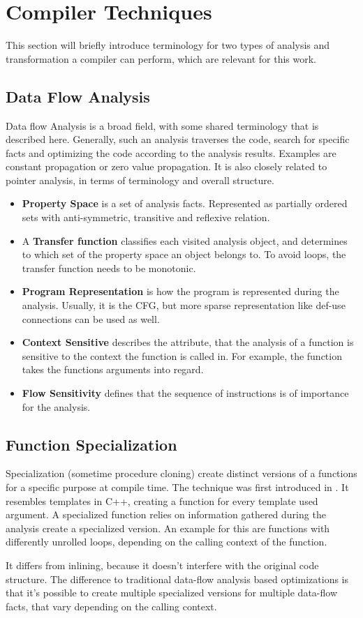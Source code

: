 \section{Compiler Techniques}
This section will briefly introduce terminology for two types of analysis and transformation a compiler can perform, which are relevant
for this work.
\subsection{Data Flow Analysis}
Data flow Analysis is a broad field, with some shared terminology that is described here. Generally, such an analysis traverses the code,
search for specific facts and optimizing the code according to the analysis results. Examples are constant propagation or zero value propagation. It is also closely related to pointer analysis, in terms of terminology and overall structure.
\begin{itemize}
	\item \textbf{Property Space} is a set of analysis facts. Represented as partially ordered sets with anti-symmetric, transitive and reflexive relation.\cite{Rastello:2016:SCD:3002539}
	\item A \textbf{Transfer function} classifies each visited analysis object, and determines to which set of the property space an object belongs to. To avoid loops, the transfer function needs to be monotonic. \cite{Rastello:2016:SCD:3002539}
	\item \textbf{Program Representation} is how the program is represented during the analysis. Usually, it is the CFG, but more sparse representation like def-use connections can be used as well. \cite{Rastello:2016:SCD:3002539}
	\item \textbf{Context Sensitive} describes the attribute, that the analysis of a function is sensitive to the context the function is called in. For example, the function
	takes the functions arguments into regard. \cite{Emami:1994:CIP:178243.178264}
	\item \textbf{Flow Sensitivity} defines that the sequence of instructions is of importance for the analysis. \cite{Hardekopf:2009:SFP:1480881.1480911}
\end{itemize}

\subsection{Function Specialization}
Specialization (sometime procedure cloning) create distinct versions of a functions for a specific purpose at compile time. The technique was first introduced in \cite{Cooper:1993:MPC:2245763.2246020}. It resembles templates in C++, creating a function for every template used argument. A specialized function relies on information gathered during the analysis create a specialized version. An example for this are functions with differently unrolled loops, depending on the calling context of the function.

It differs from inlining, because it doesn't interfere with the original code structure. The difference to traditional data-flow analysis based optimizations is that it's possible to create multiple specialized versions for multiple data-flow facts, that vary depending on the calling context.   